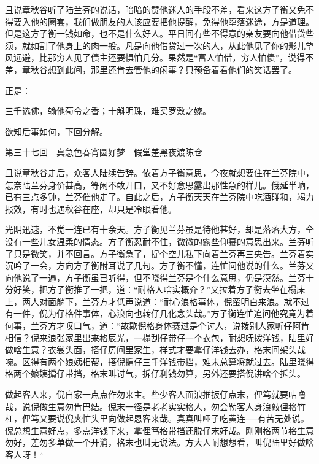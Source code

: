 \documentclass[12pt,UTF8]{ctexbook}
\begin{document}
{{{且说章秋谷听了陆兰芬的说话，暗暗的赞他迷人的手段不差，看来这方子衡又免不得要入他的圈套，我们做朋友的人该应要把他提醒，免得他堕落迷途，方是道理。但是这方子衡一钱如命，也不是什么好人。平日间有些不得意的亲友要向他借贷些须，就如割了他身上的肉一般。凡是向他借贷过一次的人，从此他见了你的影儿望风远避，比那穷人见了债主还要惧怕几分。果然是“富人怕借，穷人怕债”，说得不差，章秋谷想到此间，那里还肯去管他的闲事？只预备着看他们的笑话罢了。

正是：

三千选佛，输他荀令之香；十斛明珠，难买罗敷之嫁。

欲知后事如何，下回分解。





第三十七回　真急色春宵圆好梦　假堂差黑夜渡陈仓





且说章秋谷走后，众客人陆续告辞。依着方子衡意思，今夜就想要住在兰芬院中，怎奈陆兰芬身价甚高，等闲不敢开口，又不好意思露出那性急的样儿。俄延半晌，已有三点多钟，兰芬催他走了。自此之后，方子衡天天在兰芬院中吃酒碰和，竭力报效，有时也遇秋谷在座，却只是冷眼看他。

光阴迅速，不觉一连已有十余天。方子衡见兰芬虽是待他甚好，却是落落大方，全没有一些儿女温柔的情态。方子衡忍耐不住，微微的露些仰慕的意思出来。兰芬听了只是微笑，并不回言。方子衡急了，捉个空儿私下向着兰芬再三央告。兰芬着实沉吟了一会，方向方子衡附耳说了几句。方子衡不懂，连忙问他说的什么。兰芬又向他说了一遍，方子衡虽已听得，但不晓得兰芬是个什么意思，仍是漠然。兰芬十分好笑，把方子衡推了一把，道：“耐格人啥实概介？”又拉着方子衡去坐在榻床上，两人对面躺下，兰芬方才低声说道：“耐心浪格事体，倪蛮明白来浪。就不过有一件，倪为仔格件事体，心浪向也转仔几化念头哉。”方子衡连忙追问他究竟为着何事，兰芬方才叹口气，道：“故歇倪格身体赛过是个讨人，说拨别人家听仔阿肯相信？倪来浪张家里出来格辰光，一榻刮仔带仔一个衣包，耐想呒拨洋钱，陆里好做啥生意？衣裳头面，搭仔房间里家生，样式才要拿仔洋钱去办，格末间架头哉啘。区得有两个娘姨相帮，搭倪掮仔三千洋钱带挡，难末总算将就过去。陆里晓得格两个娘姨掮仔带挡，格末叫讨气，拆仔利钱勿算，另外还要搭倪讲啥个拆头。

做起客人来，倪自家一点点作勿来主。些少客人面浪推扳仔点末，俚笃就要咕噜哉，说倪做生意勿肯巴结。倪末一径是老老实实格人，勿会勒客人身浪敲俚格竹杠，俚笃又要说倪夹忙头里向做起恩客来哉。真真叫哑子吃黄连──有苦无处说。倪总想生意好点，多点洋钱下来，拿俚笃格带挡还脱仔末好哉。刚刚格两节格生意勿好，差勿多单做一个开消，格末也叫无说法。方大人耐想想看，叫倪陆里好做啥客人呀！“

}}}
\end{document}
